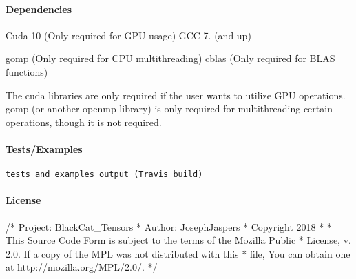 \paragraph*{Dependencies}

Cuda 10 (Only required for G\+P\+U-\/usage) G\+CC 7. (and up)

gomp (Only required for C\+PU multithreading) cblas (Only required for B\+L\+AS functions)

The cuda libraries are only required if the user wants to utilize G\+PU operations. gomp (or another openmp library) is only required for multithreading certain operations, though it is not required.

\paragraph*{Tests/\+Examples}

\href{https://travis-ci.org/josephjaspers/BlackCat_Tensors}{\tt tests and examples output (Travis build)}

\paragraph*{License}


\begin{DoxyCode}
/*  Project: BlackCat\_Tensors
 *  Author: JosephJaspers
 *  Copyright 2018
 *
 * This Source Code Form is subject to the terms of the Mozilla Public
 * License, v. 2.0. If a copy of the MPL was not distributed with this
 * file, You can obtain one at http://mozilla.org/MPL/2.0/. */
\end{DoxyCode}
 